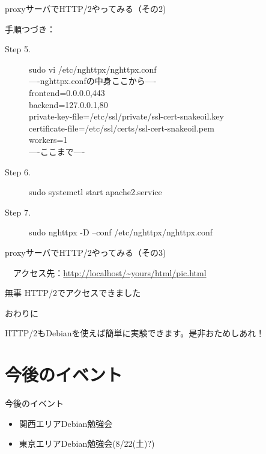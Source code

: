 \begin{frame}{proxyサーバでHTTP/2やってみる（その2)}

 手順つづき：
\begin{description}
\item [Step 5.] sudo vi /etc/nghttpx/nghttpx.conf\\
  ----nghttpx.confの中身ここから----\\
frontend=0.0.0.0,443 \\
backend=127.0.0.1,80 \\
private-key-file=/etc/ssl/private/ssl-cert-snakeoil.key \\
certificate-file=/etc/ssl/certs/ssl-cert-snakeoil.pem \\
workers=1 \\
  ----ここまで----
\item [Step 6.] sudo systemctl start apache2.service
\item [Step 7.] sudo nghttpx -D --conf /etc/nghttpx/nghttpx.conf
\end{description}

\end{frame}

\begin{frame}{proxyサーバでHTTP/2やってみる（その3)}

　アクセス先：\url{http://localhost/~yours/html/pic.html}\\
\begin{center}
 {\Large 無事 HTTP/2でアクセスできました}
\end{center}

\end{frame}

\begin{frame}{おわりに}

 HTTP/2もDebianを使えば簡単に実験できます。是非おためしあれ！
  
\end{frame}

\section{今後のイベント}
\begin{frame}{今後のイベント}
\begin{itemize}
 \item 関西エリアDebian勉強会
 \item 東京エリアDebian勉強会(8/22(土)?)
\end{itemize}
\end{frame}


